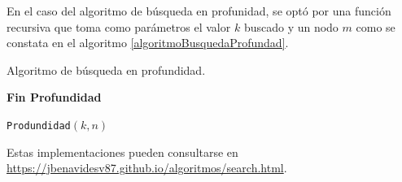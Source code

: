 \documentclass[paper=leter, fontsize=11pt]{scrartcl}
\numberwithin{equation}{section}		%
\numberwithin{figure}{section}			%
\numberwithin{table}{section}				%
\begin{document}
En el caso del algoritmo de búsqueda en profunidad, se optó por una función recursiva que toma como parámetros el valor $k$ buscado y un nodo $m$ como se constata en el algoritmo \ref{algoritmoBusquedaProfundad}.
\begin{algorithm} %
	\caption{Algoritmo de búsqueda en profundidad.}
	\label{algoritmoBusquedaProfundad}
	\SetAlgoLined
    \textbf{Fin Profundidad}

    \texttt{Produndidad}$(k, n)$\;
\end{algorithm}

Estas implementaciones pueden consultarse en \url{https://jbenavidesv87.github.io/algoritmos/search.html}.



\end{document}
